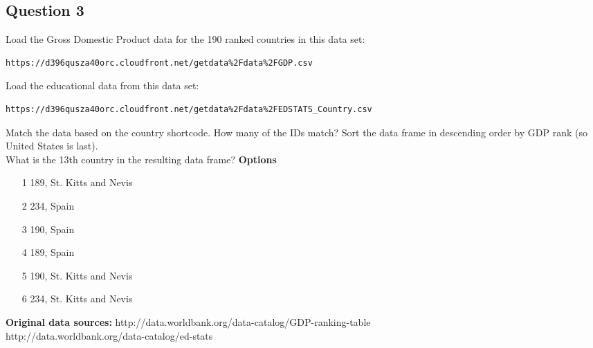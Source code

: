 \documentclass[]{article}
\begin{document}
\subsection*{Question 3}
Load the Gross Domestic Product data for the 190 ranked countries in this data set: 

\begin{verbatim}
https://d396qusza40orc.cloudfront.net/getdata%2Fdata%2FGDP.csv 
\end{verbatim}
Load the educational data from this data set: 
\begin{verbatim}
https://d396qusza40orc.cloudfront.net/getdata%2Fdata%2FEDSTATS_Country.csv 
\end{verbatim}
Match the data based on the country shortcode. How many of the IDs match? Sort the data frame in descending order by GDP rank (so United States is last). 
\\
What is the 13th country in the resulting data frame? 
\bigskip
\textbf{Options}
\begin{itemize}
\item[1] 189, St. Kitts and Nevis
\item[2] 234, Spain
\item[3] 190, Spain
\item[4] 189, Spain
\item[5] 190, St. Kitts and Nevis
\item[6] 234, St. Kitts and Nevis
\end{itemize}

\textbf{Original data sources:} 
http://data.worldbank.org/data-catalog/GDP-ranking-table \\
http://data.worldbank.org/data-catalog/ed-stats\\




\newpage
\end{document}
